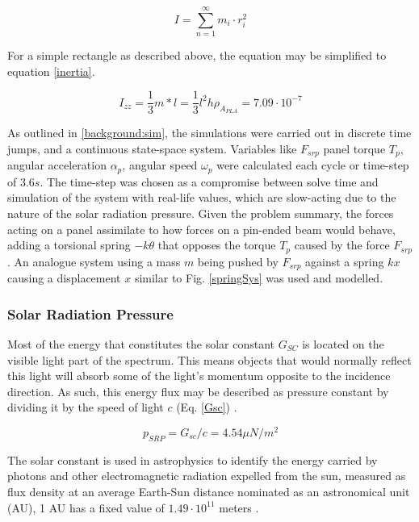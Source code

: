 \begin{equation}
    I = \sum_{n=1}^{\infty} m_i \cdot r_i^2
    \label{discreteMOI}
\end{equation}

For a simple rectangle as described above, the equation may be simplified to equation \ref{inertia}.

\begin{equation}
    I_{zz}= \frac{1}{3} m*l = \frac{1}{3} l^2h\rho_{A_{PLA}} = 7.09\cdot10^{-7} 
\label{inertia}
\end{equation}

As outlined in \ref{background:sim}, the simulations were carried out in discrete time jumps, and a continuous state-space system. Variables like $F_{srp}$ panel torque $T_{p}$, angular acceleration $\alpha_{p}$, angular speed $\omega_{p}$ were calculated each cycle or time-step of $3.6s$. The time-step was chosen as a compromise between solve time and simulation of the system with real-life values, which are slow-acting due to the nature of the solar radiation pressure.
Given the problem summary, the forces acting on a panel assimilate to how forces on a pin-ended beam would behave, adding a torsional spring $-k\theta$ that opposes the torque $T_{p}$ caused by the force $F_{srp}$. An analogue system using a mass $m$ being pushed by $F_{srp}$ against a spring $kx$ causing a displacement $x$ similar to Fig. \ref{springSys} was used and modelled.


\subsubsection{Solar Radiation Pressure} \label{experimental:srp}

Most of the energy that constitutes the solar constant $G_{SC}$ is located on the visible light part of the spectrum. This means objects that would normally reflect this light will absorb some of the light's momentum opposite to the incidence direction. As such, this energy flux may be described as pressure constant by dividing it by the speed of light $c$ (Eq. \ref{Gsc}) \cite{solarhandbook}.


\begin{equation}
p_{SRP} = G_{sc}/c = 4.54 \mu N/m^2
\label{Gsc}
\end{equation}


The solar constant is used in astrophysics to identify the
energy carried by photons and other electromagnetic radiation expelled from the sun, measured as
flux density at an average Earth-Sun distance nominated as an
astronomical unit (AU), 1 AU has a fixed value of $1.49\cdot10^{11}$ meters \protect\cite{Astro}.

